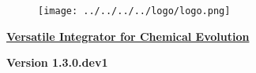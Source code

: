 
\begin{center}
\begin{figure}[!h]
\centering
\texttt{[image: ../../../../logo/logo.png]}
\end{figure}
\underline{\LARGE \textbf{Versatile Integrator for Chemical Evolution}}
\par
{\Large \textbf{Version 1.3.0.dev1}}
\end{center}
